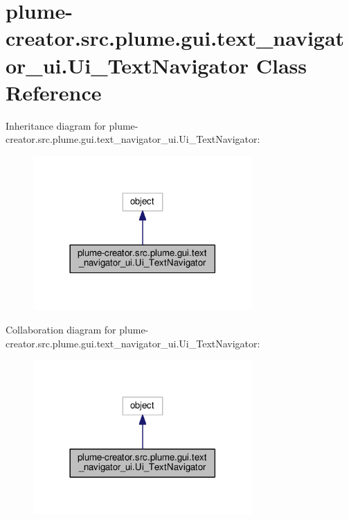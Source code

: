 \hypertarget{classplume-creator_1_1src_1_1plume_1_1gui_1_1text__navigator__ui_1_1_ui___text_navigator}{}\section{plume-\/creator.src.\+plume.\+gui.\+text\+\_\+navigator\+\_\+ui.\+Ui\+\_\+\+Text\+Navigator Class Reference}
\label{classplume-creator_1_1src_1_1plume_1_1gui_1_1text__navigator__ui_1_1_ui___text_navigator}


Inheritance diagram for plume-\/creator.src.\+plume.\+gui.\+text\+\_\+navigator\+\_\+ui.\+Ui\+\_\+\+Text\+Navigator\+:\nopagebreak
\begin{figure}[H]
\begin{center}
\leavevmode
\includegraphics[width=237pt]{classplume-creator_1_1src_1_1plume_1_1gui_1_1text__navigator__ui_1_1_ui___text_navigator__inherit__graph}
\end{center}
\end{figure}


Collaboration diagram for plume-\/creator.src.\+plume.\+gui.\+text\+\_\+navigator\+\_\+ui.\+Ui\+\_\+\+Text\+Navigator\+:\nopagebreak
\begin{figure}[H]
\begin{center}
\leavevmode
\includegraphics[width=237pt]{classplume-creator_1_1src_1_1plume_1_1gui_1_1text__navigator__ui_1_1_ui___text_navigator__coll__graph}
\end{center}
\end{figure}
